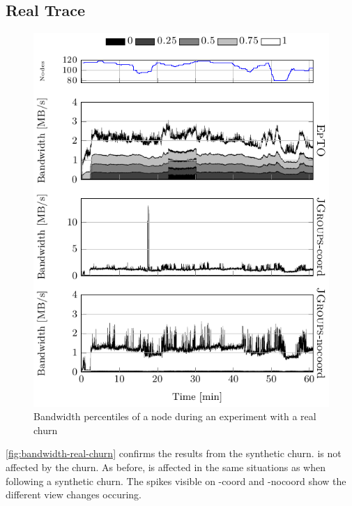 \subsection{Real Trace}
 \begin{figure}[hpt]
 	\centering
 	\includegraphics[width=\linewidth]{figures/bandwidth-real-churn.pdf}
 	\vspace{-2mm} 
 	\caption{Bandwidth percentiles of a node during an experiment with a real churn}
 	\vspace{-2mm} 
 	\label{fig:bandwidth-real-churn}
 \end{figure}
\autoref{fig:bandwidth-real-churn} confirms the results from the synthetic churn. \epto is not affected by the churn. As before, \jgroups is affected in the same situations as when following a synthetic churn. The spikes visible on \jgroups-coord and \jgroups-nocoord show the different view changes occuring. 
\par
